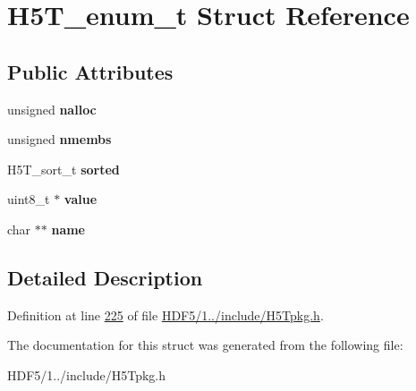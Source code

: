 \hypertarget{struct_h5_t__enum__t}{}\section{H5\+T\+\_\+enum\+\_\+t Struct Reference}
\label{struct_h5_t__enum__t}
\subsection*{Public Attributes}
\begin{DoxyCompactItemize}
\item 
\mbox{\label{struct_h5_t__enum__t_a391acfc786da91f656729da1626c8e68}} 
unsigned {\bfseries nalloc}
\item 
\mbox{\label{struct_h5_t__enum__t_aa45ec8112ee6b9b1b1080c96db85fa82}} 
unsigned {\bfseries nmembs}
\item 
\mbox{\label{struct_h5_t__enum__t_a2f35bdd0cf5657369f5d6509db095b20}} 
H5\+T\+\_\+sort\+\_\+t {\bfseries sorted}
\item 
\mbox{\label{struct_h5_t__enum__t_ade12d59e27cd6c212a6a8289a774b3c1}} 
uint8\+\_\+t $\ast$ {\bfseries value}
\item 
\mbox{\label{struct_h5_t__enum__t_a26b9061c4060232e1f22a534cb71ff1a}} 
char $\ast$$\ast$ {\bfseries name}
\end{DoxyCompactItemize}


\subsection{Detailed Description}


Definition at line \hyperlink{_h_d_f5_21_810_81_2include_2_h5_tpkg_8h_source_l00225}{225} of file \hyperlink{_h_d_f5_21_810_81_2include_2_h5_tpkg_8h_source}{H\+D\+F5/1../include/\+H5\+Tpkg.\+h}.



The documentation for this struct was generated from the following file\+:\begin{DoxyCompactItemize}
\item 
H\+D\+F5/1../include/\+H5\+Tpkg.\+h\end{DoxyCompactItemize}
